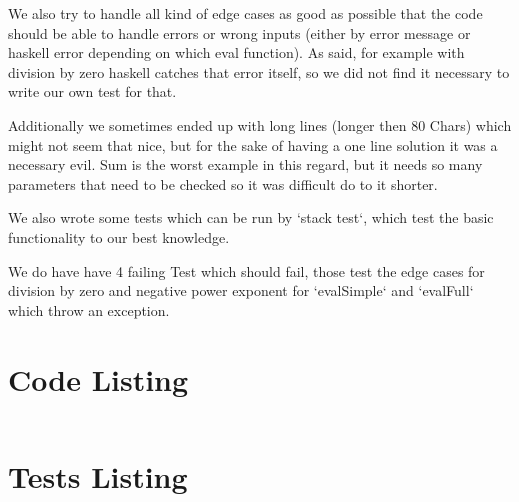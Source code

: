\documentclass[12pt,a4paper]{article}
\begin{document}
We also try to handle all kind of edge cases as good as possible that the code should be able to handle errors or wrong inputs (either by error message or haskell error depending on which eval function). As said, for example with division by zero haskell catches that error itself, so we did not find it necessary to write our own test for that.

Additionally we sometimes ended up with long lines (longer then 80 Chars) which might not seem that nice, but for the sake of having a one line solution it was a necessary evil. Sum is the worst example in this regard, but it needs so many parameters that need to be checked so it was difficult do to it shorter.


We also wrote some tests which can be run by `stack test`, which test the basic functionality to our best knowledge.

We do have have 4 failing Test which should fail, those test the edge cases for division by zero and negative power exponent for `evalSimple` and `evalFull` which throw an exception.

\appendix
\section{Code Listing}

\inputminted{haskell}{arithmetic/src/Arithmetic.hs}

\section{Tests Listing}

\inputminted{haskell}{arithmetic/test/Spec.hs}
\end{document}
